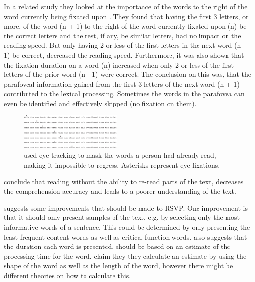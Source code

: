 In a related study they looked at the importance of the words to the right of the word currently being fixated upon \cite{eyeMovement}. They found that having the first 3 letters, or more, of the word (n + 1) to the right of the word currently fixated upon (n) be the correct letters and the rest, if any, be similar letters, had no impact on the reading speed. But only having 2 or less of the first letters in the next word (n + 1) be correct, decreased the reading speed. Furthermore, it was also shown that the fixation duration on a word (n) increased when only 2 or less of the first letters of the prior word (n - 1) were correct. The conclusion on this was, that the parafoveal information gained from the first 3 letters of the next word (n + 1) contributed to the lexical processing. Sometimes the words in the parafovea can even be identified and effectively skipped (no fixation on them).

\begin{figure}[htbp]
\centering
\includegraphics[width=0.45\textwidth]{Pics/trace_crosses}
\caption{\protect\citeauthor{schotter_dont_2014} used eye-tracking to mask the words a person had already read, making it impossible to regress. Asterisks represent eye fixations. \protect\cite{schotter_dont_2014}}
\label{fig:trace_cross}
\end{figure}

\citeauthor{schotter_dont_2014} conclude that reading without the ability to re-read parts of the text, decreases the comprehension accuracy and leads to a poorer understanding of the text.


 suggests some improvements that should be made to RSVP. One improvement is that it should only present samples of the text, e.g. by selecting only the most informative words of a sentence. This could be determined by only presenting the least frequent content words as well as critical function words.  also suggests that the duration each word is presented, should be based on an estimate of the processing time for the word.  claim they they calculate an estimate by using the shape of the word as well as the length of the word, however there might be different theories on how to calculate this.

